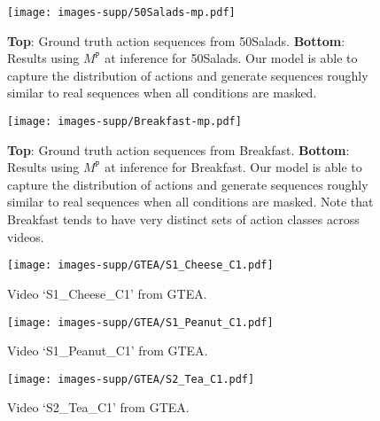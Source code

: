 \documentclass[10pt,twocolumn,letterpaper]{article}
\begin{document}
\begin{figure}[t]
\vspace{-2.5cm}
\begin{center}
   \texttt{[image: images-supp/50Salads-mp.pdf]}
\end{center}
   \caption{\textbf{Top}: Ground truth action sequences from 50Salads. \textbf{Bottom}: Results using $M^\mathtt{P}$ at inference for 50Salads. Our model is able to capture the distribution of actions and generate sequences roughly similar to real sequences when all conditions are masked.}
\label{fig:50Salads-mp}
\end{figure}

\begin{figure}[h]
\vspace{-2.5cm}
\begin{center}
   \texttt{[image: images-supp/Breakfast-mp.pdf]}
\end{center}
   \caption{\textbf{Top}: Ground truth action sequences from Breakfast. \textbf{Bottom}: Results using $M^\mathtt{P}$ at inference for Breakfast. Our model is able to capture the distribution of actions and generate sequences roughly similar to real sequences when all conditions are masked. Note that Breakfast tends to have very distinct sets of action classes across videos.}
\label{fig:Breakfast-mp}
\end{figure}

\begin{figure}[h]
\vspace{-0.3cm}
\begin{center}
   \texttt{[image: images-supp/GTEA/S1\_Cheese\_C1.pdf]}
\end{center}
   \caption{Video `S1\_Cheese\_C1' from GTEA.}
\label{fig:GTEA-1}
\end{figure}

\begin{figure}[h]
\vspace{-0.3cm}
\begin{center}
   \texttt{[image: images-supp/GTEA/S1\_Peanut\_C1.pdf]}
\end{center}
   \caption{Video `S1\_Peanut\_C1' from GTEA.}
\label{fig:GTEA-2}
\end{figure}

\begin{figure}[h]
\vspace{-0.3cm}
\begin{center}
   \texttt{[image: images-supp/GTEA/S2\_Tea\_C1.pdf]}
\end{center}
   \caption{Video `S2\_Tea\_C1' from GTEA.}
\label{fig:GTEA-3}
\end{figure}
\end{document}
